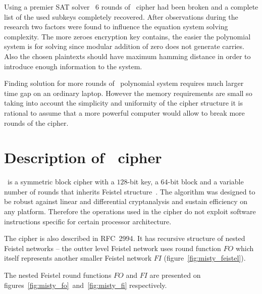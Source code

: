 Using a premier SAT solver~\cite{soos:cryptominisat} $6$ rounds of \gost\ cipher
had been broken and a complete list of the used subkeys completely recovered.
After observations during the research two factors were found to influence the
equation system solving complexity. The more zeroes encryption key contains, the
easier the polynomial system is for solving since modular addition of zero does
not generate carries. Also the chosen plaintexts should have maximum hamming
distance in order to introduce enough information to the system.

Finding solution for more rounds of \gost\ polynomial system requires
much larger time gap on an ordinary laptop. However the memory requirements are
small so taking into account the simplicity and uniformity of the cipher
structure it is rational to assume that a more powerful computer would allow to
break more rounds of the cipher.


\section{Description of \misty\ cipher}

\misty\ is a symmetric block cipher with a $128$-bit key, a $64$-bit block 
and a variable number of rounds that inherits Feistel
structure~\cite{matsui1997new}. The algorithm was designed to be robust against
linear and differential cryptanalysis and sustain efficiency on any platform.
Therefore the operations used in the cipher do not exploit software instructions
specific for certain processor architecture.

The cipher is also described in RFC~2994. It has recursive structure of nested
Feistel networks -- the outter level Feistel network uses round function $FO$
which itself represents another smaller Feistel network $FI$ 
(figure~\ref{fig:misty_feistel}).

The nested Feistel round functions $FO$ and $FI$ are presented on
figures~\ref{fig:misty_fo}~and~\ref{fig:misty_fi} respectively.

